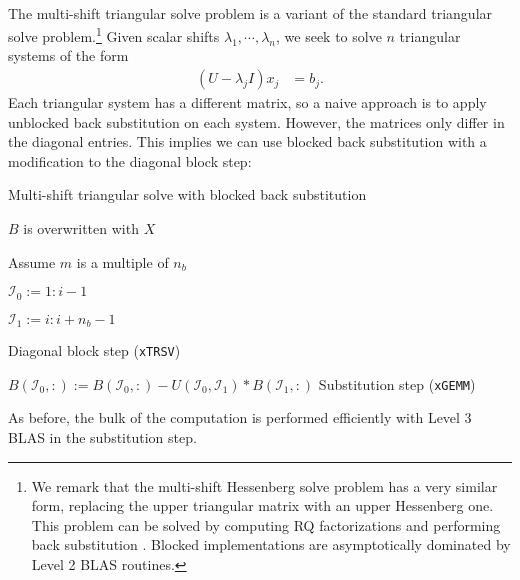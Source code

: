 \documentclass{article}
\begin{document}
\paragraph{}
The multi-shift triangular solve problem is a variant of the standard
triangular solve problem.\footnote{We remark that the multi-shift
  Hessenberg solve problem has a very similar form, replacing the
  upper triangular matrix with an upper Hessenberg one. This problem
  can be solved by computing RQ factorizations and performing back
  substitution \cite{henry1994shifted, bischof1996parallel}. Blocked
  implementations are asymptotically dominated by Level 2 BLAS
  routines.} Given scalar shifts \(\lambda_1,\cdots,\lambda_n\),
we seek to solve \(n\) triangular systems of the form
\begin{align}
  \left(U-\lambda_j I\right) x_j &= b_j.
\end{align}
Each triangular system has a different matrix, so a naive approach is
to apply unblocked back substitution on each system. However, the
matrices only differ in the diagonal entries. This implies we can use
blocked back substitution with a modification to the diagonal block
step:
\begin{algorithm}[H]
  \caption{Multi-shift triangular solve with blocked back substitution}
  \label{algorithm:multi-shift trsm}
  \begin{algorithmic}
    \Comment \(B\) is overwritten with \(X\)

     \Comment Assume \(m\) is a multiple of
    \(n_b\)

    \State \( \mathcal{I}_0 := 1:i-1 \)

    \State \( \mathcal{I}_1 := i:i+n_b-1\)
    

    \State {} 
    \Comment Diagonal block step (\texttt{xTRSV})

    \EndFor

    \State \( B(\mathcal{I}_0,:) := B(\mathcal{I}_0,:) - U(\mathcal{I}_0,\mathcal{I}_1) * B(\mathcal{I}_1,:) \)
    \Comment Substitution step (\texttt{xGEMM})

    \EndFor

    \EndProcedure
  \end{algorithmic}
\end{algorithm}
\noindent
As before, the bulk of the computation is performed efficiently with
Level 3 BLAS in the substitution step.
\end{document}
